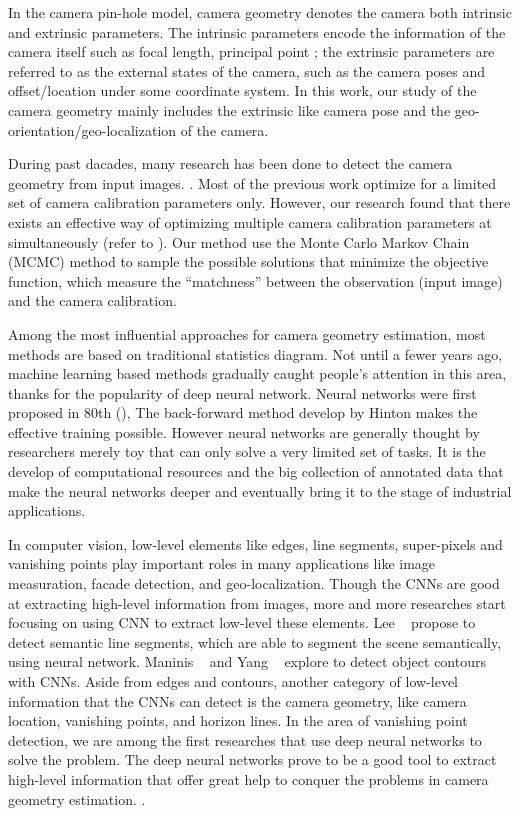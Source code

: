 In the camera pin-hole model, camera geometry denotes the camera
both intrinsic and extrinsic parameters. The intrinsic parameters
encode the information of the camera itself such as focal length,
principal point \etc; the extrinsic parameters are referred to as the
external states of the camera, such as the camera poses and
offset/location under some coordinate system. In this work, our study
of the camera geometry mainly includes the extrinsic like camera pose
and the geo-orientation/geo-localization of the camera.

During past dacades, many research has been done to detect the camera
geometry from input images. . Most of the
previous work optimize for a limited set of camera calibration
parameters only. However, our research found that there exists an
effective way of optimizing multiple camera calibration parameters at
simultaneously (refer to ). Our method use the Monte
Carlo Markov Chain (MCMC) method to sample the possible solutions that
minimize the objective function, which measure the ``matchness''
between the observation (input image) and the camera calibration.

Among the most influential approaches for camera geometry estimation,
most methods are based on traditional statistics diagram. Not until a
fewer years ago, machine learning based methods gradually caught
people's attention in this area, thanks for the popularity of deep
neural network. Neural networks were first proposed in 80th
(), The back-forward method develop by Hinton
 makes the effective training possible. However neural
networks are generally thought by researchers merely toy that can only
solve a very limited set of tasks. It is the develop of computational
resources and the big collection of annotated data that make the
neural networks deeper and eventually bring it to the stage of
industrial applications.

In computer vision, low-level elements like edges, line segments,
super-pixels and vanishing points play important roles in many
applications like image measuration, facade detection, and
geo-localization.
Though the CNNs are good at extracting high-level information from
images, more and more researches start focusing on using CNN to
extract low-level these elements.
%
Lee \etal~\cite{lee2017semantic} propose to detect semantic line
segments, which are able to segment the scene semantically, using
neural network. Maninis \etal~\cite{maninis2016convolutional} and Yang
\etal~\cite{yang2016object} explore to detect object contours with
CNNs.
%
Aside from edges and contours, another category of low-level
information that the CNNs can detect is the camera geometry, like
camera location, vanishing points, and horizon lines.
%
In the area of vanishing point detection, we are among the first
researches that use deep neural networks to solve the problem. The
deep neural networks prove to be a good tool to extract high-level
information that offer great help to conquer the problems in camera
geometry estimation. .

